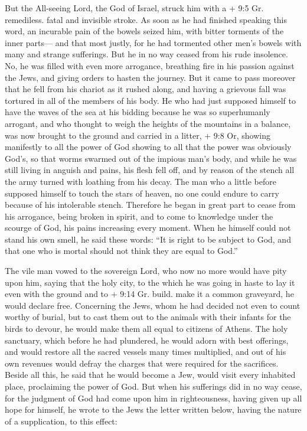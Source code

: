  But the All-seeing Lord, the God of Israel, struck him with
a + 9:5 Gr. remediless. fatal and invisible stroke. As soon as he had
finished speaking this word, an incurable pain of the bowels seized him,
with bitter torments of the inner parts---  and that most
justly, for he had tormented other men's bowels with many and strange
sufferings.  But he in no way ceased from his rude
insolence. No, he was filled with even more arrogance, breathing fire in
his passion against the Jews, and giving orders to hasten the journey.
But it came to pass moreover that he fell from his chariot as it rushed
along, and having a grievous fall was tortured in all of the members of
his body.  He who had just supposed himself to have the
waves of the sea at his bidding because he was so superhumanly arrogant,
and who thought to weigh the heights of the mountains in a balance, was
now brought to the ground and carried in a litter, + 9:8 Or, showing
manifestly to all the power of God showing to all that the power was
obviously God's,  so that worms swarmed out of the impious
man's body, and while he was still living in anguish and pains, his
flesh fell off, and by reason of the stench all the army turned with
loathing from his decay.  The man who a little before
supposed himself to touch the stars of heaven, no one could endure to
carry because of his intolerable stench.  Therefore he
began in great part to cease from his arrogance, being broken in spirit,
and to come to knowledge under the scourge of God, his pains increasing
every moment.  When he himself could not stand his own
smell, he said these words: ``It is right to be subject to God, and that
one who is mortal should not think they are equal to God.''

 The vile man vowed to the sovereign Lord, who now no more
would have pity upon him, saying  that the holy city, to
the which he was going in haste to lay it even with the ground and to +
9:14 Gr. build. make it a common graveyard, he would declare free.
 Concerning the Jews, whom he had decided not even to count
worthy of burial, but to cast them out to the animals with their infants
for the birds to devour, he would make them all equal to citizens of
Athens.  The holy sanctuary, which before he had plundered,
he would adorn with best offerings, and would restore all the sacred
vessels many times multiplied, and out of his own revenues would defray
the charges that were required for the sacrifices.  Beside
all this, he said that he would become a Jew, would visit every
inhabited place, proclaiming the power of God.  But when
his sufferings did in no way cease, for the judgment of God had come
upon him in righteousness, having given up all hope for himself, he
wrote to the Jews the letter written below, having the nature of a
supplication, to this effect:


